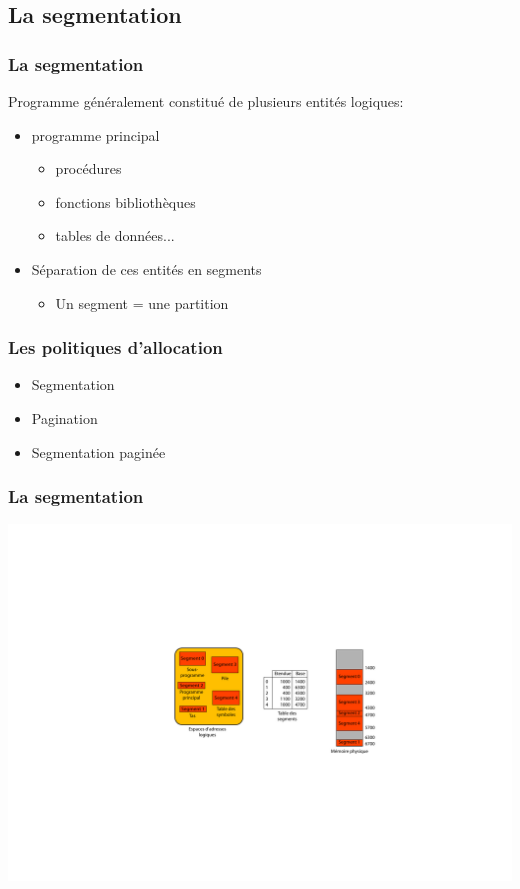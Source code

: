 \subsection{La segmentation}
\begin{frame}
\frametitle{La segmentation}
Programme généralement constitué de plusieurs entités logiques:
\begin{itemize}
\item programme principal
\begin{itemize}
\item procédures
\item fonctions bibliothèques
\item tables de données...
\end{itemize}
\item Séparation de ces entités en segments
\begin{itemize}
\item Un segment = une partition
\end{itemize}
\end{itemize}
\end{frame}


\begin{frame}
\frametitle{Les politiques d'allocation}
\begin{itemize}
\item Segmentation
\item Pagination
\item Segmentation paginée
\end{itemize}
\end{frame}


\begin{frame}
\frametitle{La segmentation}
\includegraphics[width=\textwidth]{../illustration/memoire_segment_exemple.pdf}
\end{frame}


